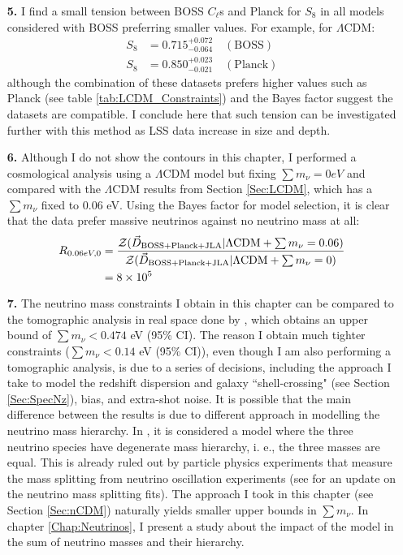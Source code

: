 \begin{itemize}
\item[\textbf{5.}] I find a small tension between BOSS $C_{\ell}$s and Planck for $S_8$ in all models considered with BOSS preferring smaller values. For example, for $\Lambda$CDM: 
\begin{align*}
S_8 & = 0.715^{+0.072}_{-0.064} \quad(\text{BOSS}) \\ \nonumber
S_8 &  = 0.850^{+0.023}_{-0.021}\quad(\text{Planck}) \nonumber
\end{align*}
although the combination of these datasets prefers higher values such as Planck (see table \ref{tab:LCDM_Constraints}) and the Bayes factor suggest the datasets are compatible. I conclude here that such tension can be investigated further with this method as LSS data increase in size and depth.

\item[\textbf{6.}] Although I do not show the contours in this chapter, I performed a cosmological analysis using a $\Lambda$CDM model but fixing $\sum m_{\nu} = 0 eV$ and compared with the $\Lambda$CDM results from Section \ref{Sec:LCDM}, which has a $\sum m_{\nu}$ fixed to $0.06$ eV. Using the Bayes factor for model selection, it is clear that the data prefer massive neutrinos against no neutrino mass at all:
\begin{align}
R_{0.06 eV, 0} & = \frac{\mathcal{Z}(\vec{D}_{\tiny\text{BOSS+Planck+JLA}}| \Lambda\text{CDM} + \sum m_{\nu} = 0.06)}{\mathcal{Z}(\vec{D}_{\tiny\text{BOSS+Planck+JLA}}| \Lambda\text{CDM} + \sum m_{\nu} = 0)} \nonumber \\
& = 8 \times 10^5 \nonumber
\end{align}

\item[\textbf{7.}] The neutrino mass constraints I obtain in this chapter can be compared to the tomographic analysis in real space done by \cite{2017SalazarBOSSwTheta}, which obtains an upper bound of $\sum m_{\nu} < 0.474$ eV (95\% CI). The reason I obtain much tighter constraints ($\sum m_{\nu} < 0.14$ eV (95\% CI)), even though I am also performing a tomographic analysis, is due to a series of decisions, including the approach I take to model the redshift dispersion and galaxy ``shell-crossing" (see Section \ref{Sec:SpecNz}), bias, and extra-shot noise. It is possible that the main difference between the results is due to different approach in modelling the neutrino mass hierarchy. In \cite{2017SalazarBOSSwTheta}, it is considered a model where the three neutrino species have degenerate mass hierarchy, i. e., the three masses are equal. This is already ruled out by particle physics experiments that measure the mass splitting from neutrino oscillation experiments (see \citealt{2014Gonzalez-GarciaNeutrino} for an update on the neutrino mass splitting fits). The approach I took in this chapter (see Section \ref{Sec:nCDM}) naturally yields smaller upper bounds in $\sum m_{\nu}$. In chapter \ref{Chap:Neutrinos}, I present a study about the impact of the model in the sum of neutrino masses and their hierarchy.

\end{itemize}


